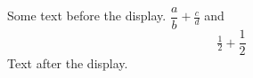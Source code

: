 \documentclass[12pt]{article}
\begin{document}
Some text before the display.
$\dfrac{a}{b} + \tfrac{c}{d}$ and \[ \tfrac{1}{2} + \dfrac{1}{2} \]
Text after the display.
\end{document}
